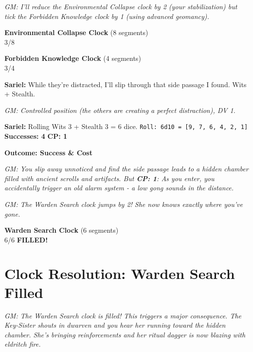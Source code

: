 \documentclass[11pt]{article}
\newcommand{\player}[1]{\textbf{#1:}}
\newcommand{\gm}[1]{\textit{GM: #1}}
\newcommand{\roll}[2]{\texttt{Roll: #1d10 = [#2]}}
\newcommand{\success}[1]{\textbf{Successes: #1}}
\newcommand{\cp}[1]{\textbf{CP: #1}}
\newcommand{\outcome}[1]{\textbf{Outcome: #1}}
\newcommand{\clocksegment}{\textbullet}
\begin{document}
\gm{I'll reduce the Environmental Collapse clock by 2 (your stabilization) but tick the Forbidden Knowledge clock by 1 (using advanced geomancy).}

\begin{center}
\textbf{Environmental Collapse Clock} (8 segments)\\
\fbox{\textcolor{clockcolor}{\clocksegment\clocksegment\clocksegment}\clocksegment\clocksegment\clocksegment\clocksegment\clocksegment} 3/8
\end{center}

\begin{center}
\textbf{Forbidden Knowledge Clock} (4 segments)\\
\fbox{\textcolor{clockcolor}{\clocksegment\clocksegment\clocksegment}\clocksegment} 3/4
\end{center}

\player{Sariel} While they're distracted, I'll slip through that side passage I found. Wits + Stealth.

\gm{Controlled position (the others are creating a perfect distraction), DV 1.}

\player{Sariel} Rolling Wits 3 + Stealth 3 = 6 dice. \roll{6}{9, 7, 6, 4, 2, 1} \success{4} \cp{1}

\outcome{Success \& Cost}

\gm{You slip away unnoticed and find the side passage leads to a hidden chamber filled with ancient scrolls and artifacts. But \cp{1}: As you enter, you accidentally trigger an old alarm system - a low gong sounds in the distance.}

\gm{The Warden Search clock jumps by 2! She now knows exactly where you've gone.}

\begin{center}
\textbf{Warden Search Clock} (6 segments)\\
\fbox{\textcolor{clockcolor}{\clocksegment\clocksegment\clocksegment\clocksegment\clocksegment\clocksegment}} 6/6 \textbf{FILLED!}
\end{center}

\section*{Clock Resolution: Warden Search Filled}

\gm{The Warden Search clock is filled! This triggers a major consequence. The Key-Sister shouts in dwarven and you hear her running toward the hidden chamber. She's bringing reinforcements and her ritual dagger is now blazing with eldritch fire.}
\end{document}
